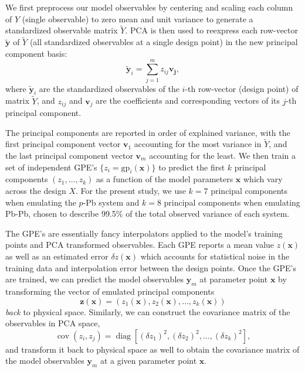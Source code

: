 \documentclass[aps,prc,reprint,amsmath,nofootinbib]{revtex4-1}
\newcommand{\x}{\mathbf x}
\newcommand{\y}{\mathbf y}
\DeclareMathOperator{\diag}{diag}
\DeclareMathOperator{\cov}{cov}
\begin{document}
We first preprocess our model observables by centering and scaling each column of $Y$ (single observable) to zero mean and unit variance to generate a standardized observable matrix $\tilde{Y}$.
PCA is then used to reexpress each row-vector $\tilde{\y}$ of $\tilde{Y}$ (all standardized observables at a single design point) in the new principal component basis:
\begin{equation}
  \tilde{\y}_i = \sum\limits_{j=1}^m z_{ij} \mathbf{v_j},
\end{equation}
where $\tilde{\y}_i$ are the standardized observables of the $i$-th row-vector (design point) of matrix $\tilde{Y}$, and $z_{ij}$ and $\mathbf{v}_j$ are the coefficients and corresponding vectors of its $j$-th principal component.

The principal components are reported in order of explained variance, with the first principal component vector $\mathbf{v}_1$ accounting for the most variance in $\tilde{Y}$, and the last principal component vector $\mathbf{v}_m$ accounting for the least.
We then train a set of independent GPE's $\{z_i=\mathrm{gp}_i(\x)\}$ to predict the first $k$ principal components $(z_1, \dots, z_k)$ as a function of the model parameters $\x$ which vary across the design $X$.
For the present study, we use $k=7$ principal components when emulating the $p$-Pb system and $k=8$ principal components when emulating Pb-Pb, chosen to describe 99.5\% of the total observed variance of each system.

The GPE's are essentially fancy interpolators applied to the model's training points and PCA transformed observables.
Each GPE reports a mean value $z(\x)$ as well as an estimated error $\delta z(\x)$ which accounts for statistical noise in the training data and interpolation error between the design points.
Once the GPE's are trained, we can predict the model observables $\y_m$ at parameter point $\x$ by transforming the vector of emulated principal components
\begin{equation}
  \mathbf{z}(\x) = (z_1(\x), z_2(\x), \dots, z_k(\x))
\end{equation}
\emph{back} to physical space.
Similarly, we can construct the covariance matrix of the observables in PCA space,
\begin{equation}
  \cov(z_i, z_j) = \diag[(\delta z_{1})^2, (\delta z_2)^2, \dots, (\delta z_k)^2 ],
\end{equation}
and transform it back to physical space as well to obtain the covariance matrix of the model observables $\y_m$ at a given parameter point $\x$.
\end{document}
